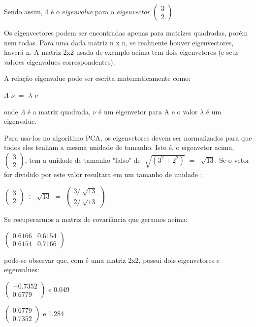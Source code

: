Sendo assim, 4 é o \textit{eigenvalue} para o \textit{eigenvector}  $\begin{pmatrix} 3 \\ 2\end{pmatrix}$.

Os eigenvectores podem ser encontradas apenas para matrizes quadradas, porém nem todas. Para uma dada matriz n x n, se realmente houver eigenvectores, haverá n. A matriz 2x2 usada de exemplo acima tem dois eigenvetores (e seus valores eigenvalues correspondentes).

A relação eigenvalue pode ser escrita matematicamente como: 

 $\Lambda$ $\nu$  $=$  $\lambda$ $\nu$  

onde $\Lambda$ é a matriz quadrada, $\nu$ é um eigenvetor para A e o valor $\lambda$ é um eigenvalue.

Para usa-los no algorítimo PCA, os eigenvetores devem ser normalizados para que todos eles tenham a mesma unidade de tamanho. Isto é, o eigenvetor acima, $\begin{pmatrix} 3 \\ 2\end{pmatrix}$, tem a unidade de tamanho "falso"  de  $\sqrt[]{(3^2 + 2^2)}$ $=$ $\sqrt[]{13}$. Se o vetor for dividido por este valor resultara em um tamanho de unidade \cite{drmathew_java_programming}:

\begin{center}
	$\begin{pmatrix} 3 \\ 2 \end{pmatrix}$ 
	$\div$  
	$\sqrt[]{13}$ $=$ 
	$\begin{pmatrix} 3 / \sqrt[]{13} \\ 2/\sqrt[]{13} \end{pmatrix}$
\end{center}

Se recuperarmos a matriz de covariância que geramos acima:

\begin{center}
	$\begin{pmatrix} 0.6166 & 0.6154 \\ 0.6154 & 0.7166 \end{pmatrix}$
\end{center}

pode-se observar que, com é uma matriz 2x2, possui dois eigenvetores e eigenvalues:

\begin{center}
$\begin{pmatrix} -0.7352 \\ 0.6779 \end{pmatrix}$  e 0.049

$\begin{pmatrix} 0.6779 \\ 0.7352 \end{pmatrix}$  e 1.284
\end{center}

